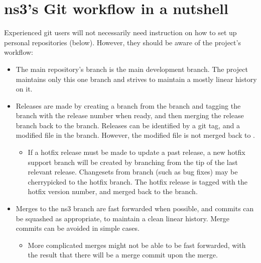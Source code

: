 \documentclass[letterpaper,10pt,english]{sphinxmanual}
\renewcommand{\sphinxcode}[1]{\texttt{\small{#1}}}
\begin{document}
\section{ns\sphinxhyphen{}3’s Git workflow in a nutshell}
\label{\detokenize{working-with-git:ns-3-s-git-workflow-in-a-nutshell}}
Experienced git users will not necessarily need instruction on how to set up personal repositories (below).  However, they should be aware of the project’s workflow:
\begin{itemize}
\item {} 
The main repository’s \sphinxcode{} branch is the main development branch.  The project maintains only this one branch and strives to maintain a mostly linear history on it.

\item {} 
Releases are made by creating a branch from the \sphinxcode{} branch and tagging the branch with the release number when ready, and then merging the release branch back to the \sphinxcode{} branch.  Releases can be identified by a git tag, and a modified \sphinxcode{} file in the branch.  However, the modified \sphinxcode{} file is not merged back to \sphinxcode{}.
\begin{itemize}
\item {} 
If a hotfix release must be made to update a past release, a new hotfix support branch will be created by branching from the tip of the last relevant release.  Changesets from \sphinxcode{} branch (such as bug fixes) may be cherry\sphinxhyphen{}picked to the hotfix branch.  The hotfix release is tagged with the hotfix version number, and merged back to the \sphinxcode{} branch.

\end{itemize}

\item {} 
Merges to the ns\sphinxhyphen{}3 \sphinxcode{} branch are fast forwarded when possible, and commits can be squashed as appropriate, to maintain a clean linear history.  Merge commits can be avoided in simple cases.
\begin{itemize}
\item {} 
More complicated merges might not be able to be fast forwarded, with the result that there will be a merge commit upon the merge.

\end{itemize}


\end{itemize}
\end{document}

